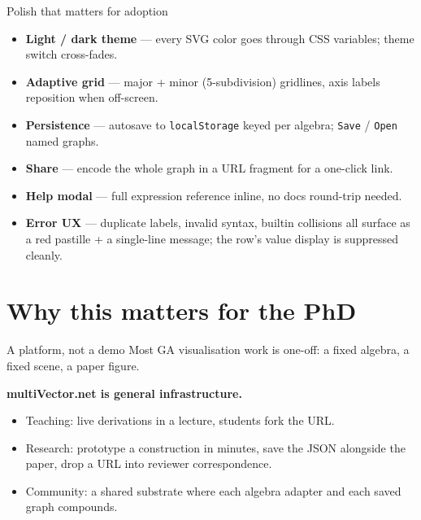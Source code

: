 \documentclass[aspectratio=169,11pt]{beamer}
\begin{document}
\begin{frame}{Polish that matters for adoption}
  \begin{itemize}
    \item \textbf{Light / dark theme} — every SVG color goes through CSS
          variables; theme switch cross-fades.
    \item \textbf{Adaptive grid} — major + minor (5-subdivision) gridlines,
          axis labels reposition when off-screen.
    \item \textbf{Persistence} — autosave to \texttt{localStorage} keyed
          per algebra; \texttt{Save} / \texttt{Open} named graphs.
    \item \textbf{Share} — encode the whole graph in a URL fragment for
          a one-click link.
    \item \textbf{Help modal} — full expression reference inline, no
          docs round-trip needed.
    \item \textbf{Error UX} — duplicate labels, invalid syntax, builtin
          collisions all surface as a red pastille + a single-line
          message; the row's value display is suppressed cleanly.
  \end{itemize}
\end{frame}

\section{Why this matters for the PhD}

\begin{frame}{A platform, not a demo}
  Most GA visualisation work is one-off: a fixed algebra, a fixed scene,
  a paper figure.

  \medskip
  \textbf{multiVector.net is general infrastructure.}
  \begin{itemize}
    \item Teaching: live derivations in a lecture, students fork the URL.
    \item Research: prototype a construction in minutes, save the JSON
          alongside the paper, drop a URL into reviewer correspondence.
    \item Community: a shared substrate where each algebra adapter and
          each saved graph compounds.
  \end{itemize}
\end{frame}
\end{document}
